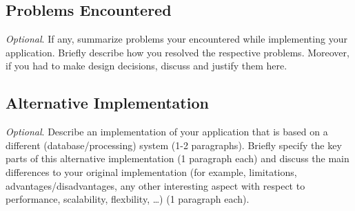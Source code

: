 \subsection{Problems Encountered}

\emph{Optional}. If any, summarize problems your encountered while implementing
your application. Briefly describe how you resolved the respective problems.
Moreover, if you had to make design decisions, discuss and justify them here.

\subsection{Alternative Implementation}

\emph{Optional}. Describe an implementation of your application that is based on
a different (database/processing) system (1-2 paragraphs). Briefly specify the
key parts of this alternative implementation (1 paragraph each) and discuss the
main differences to your original implementation (for example, limitations,
advantages/disadvantages, any other interesting aspect with respect to
performance, scalability, flexbility, \ldots) (1 paragraph each).
